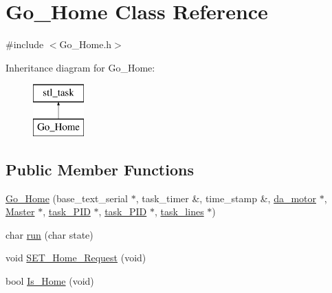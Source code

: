 \hypertarget{classGo__Home}{\section{Go\-\_\-\-Home Class Reference}
\label{classGo__Home}
}


{\ttfamily \#include $<$Go\-\_\-\-Home.\-h$>$}

Inheritance diagram for Go\-\_\-\-Home\-:\begin{figure}[H]
\begin{center}
\leavevmode
\includegraphics[height=2.000000cm]{classGo__Home}
\end{center}
\end{figure}
\subsection*{Public Member Functions}
\begin{DoxyCompactItemize}
\item 
\hyperlink{classGo__Home_a080085bcc6207561d5309d5f861b10cf}{Go\-\_\-\-Home} (base\-\_\-text\-\_\-serial $\ast$, task\-\_\-timer \&, time\-\_\-stamp \&, \hyperlink{classda__motor}{da\-\_\-motor} $\ast$, \hyperlink{classMaster}{Master} $\ast$, \hyperlink{classtask__PID}{task\-\_\-\-P\-I\-D} $\ast$, \hyperlink{classtask__PID}{task\-\_\-\-P\-I\-D} $\ast$, \hyperlink{classtask__lines}{task\-\_\-lines} $\ast$)
\item 
char \hyperlink{classGo__Home_ae1421efd3ca49627022675f74534ced6}{run} (char state)
\item 
void \hyperlink{classGo__Home_a1c22463a7cca8fd6a8ab4c5c9ecee6ff}{S\-E\-T\-\_\-\-Home\-\_\-\-Request} (void)
\item 
bool \hyperlink{classGo__Home_a23ee51618c74f918af0ddf4555c7ff04}{Is\-\_\-\-Home} (void)
\end{DoxyCompactItemize}
